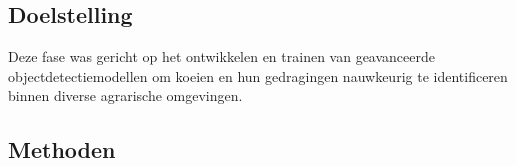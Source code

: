 \chapter{}
\label{ch:objectdetectie}

\section{Doelstelling}
Deze fase was gericht op het ontwikkelen en trainen van geavanceerde objectdetectiemodellen om koeien en hun gedragingen nauwkeurig te identificeren binnen diverse agrarische omgevingen.

\section{Methoden}
